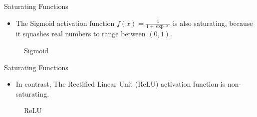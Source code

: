 \documentclass[compress,oilve,t]{beamer}
\begin{document}
\begin{frame}{Saturating Functions}
	\begin{itemize}
		\item The Sigmoid activation function  $f(x) = \frac{1}{1+\exp^{-x}}$ is also saturating, because it squashes real numbers to range between $(0, 1)$.
	\end{itemize}
	\begin{figure}[H]
		\centering
		\caption{Sigmoid}
	\end{figure}
\end{frame}

\begin{frame}{Saturating Functions}
	\begin{itemize}
		\item In contrast, The Rectified Linear Unit (ReLU) activation function is non-saturating.
	\end{itemize}
	\begin{figure}[H]
		\centering
		\caption{ReLU}
	\end{figure}
\end{frame}
\end{document}
